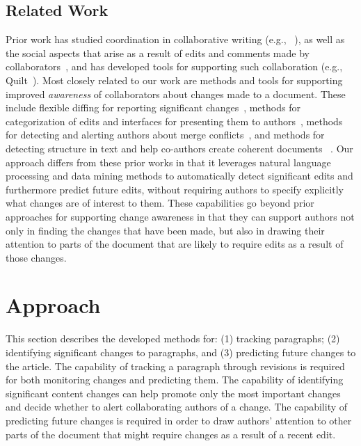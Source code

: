 \subsection{Related Work}\label{related-work}

Prior work has studied coordination in collaborative writing (e.g.,
~\cite{neuwirth2001computer,kittur2007he}), as well as the social
aspects that arise as a result of edits and comments made by
collaborators~\cite{birnholtz2012tracking,birnholtz2013write}, and has
developed tools for supporting such collaboration (e.g.,
Quilt~\cite{fish1988quilt}). Most closely related to our work are
methods and tools for supporting improved \emph{awareness} of
collaborators about changes made to a document. These include flexible
diffing for reporting significant changes~\cite{neuwirth1992flexible},
methods for categorization of edits and interfaces for presenting them
to
authors~\cite{fong2010did,papadopoulou2007structured,tam2006framework},
methods for detecting and alerting authors about merge
conflicts~\cite{hainsworth2006enabling}, and methods for detecting
structure in text and help co-authors create coherent documents~
\cite{de2007narrative}. Our approach differs from these prior works in
that it leverages natural language processing and data mining methods to
automatically detect significant edits and furthermore predict future
edits, without requiring authors to specify explicitly what changes are
of interest to them. These capabilities go beyond prior approaches for
supporting change awareness in that they can support authors not only in
finding the changes that have been made, but also in drawing their
attention to parts of the document that are likely to require edits as a
result of those changes.

\section{Approach}\label{approach}

This section describes the developed methods for: (1) tracking
paragraphs; (2) identifying significant changes to paragraphs, and (3)
predicting future changes to the article. The capability of tracking a
paragraph through revisions is required for both monitoring changes and
predicting them. The capability of identifying significant content
changes can help promote only the most important changes and decide
whether to alert collaborating authors of a change. The capability of
predicting future changes is required in order to draw authors'
attention to other parts of the document that might require changes as a
result of a recent edit.

